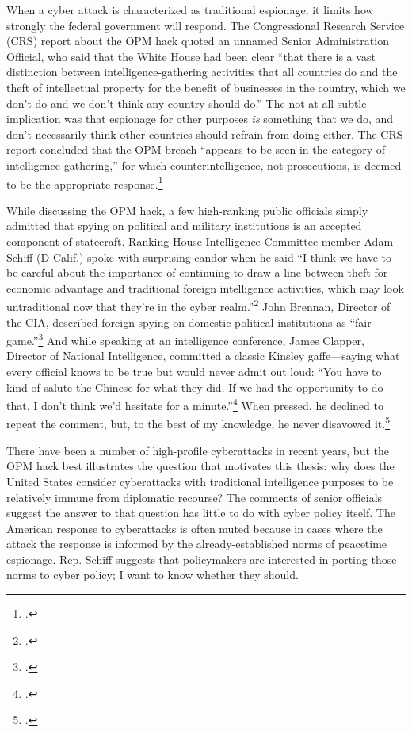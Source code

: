 \documentclass{memoir}
\begin{document}
\begin{refsegment}
When a cyber attack is characterized as traditional espionage, it limits how strongly the federal government will respond. The Congressional Research Service (CRS) report about the OPM hack quoted an unnamed Senior Administration Official, who said that the White House had been clear ``that there is a vast distinction between intelligence-gathering activities that all countries do and the theft of intellectual property for the benefit of businesses in the country, which we don't do and we don't think any country should do.'' The not-at-all subtle implication was that espionage for other purposes \emph{is} something that we do, and don't necessarily think other countries should refrain from doing either. The CRS report concluded that the OPM breach ``appears to be seen in the category of intelligence-gathering,'' for which counterintelligence, not prosecutions, is deemed to be the appropriate response.\footcite{finklea_cyber_2015}

While discussing the OPM hack, a few high-ranking public officials simply admitted that spying on political and military institutions is an accepted component of statecraft. Ranking House Intelligence Committee member Adam Schiff (D-Calif.) spoke with surprising candor when he said ``I think we have to be careful about the importance of continuing to draw a line between theft for economic advantage and traditional foreign intelligence activities, which may look untraditional now that they’re in the cyber realm.''\footcite{nakashima_hacks_2015} John Brennan, Director of the CIA, described foreign spying on domestic political institutions as ``fair game.''\footcite{sanger_u.s._2016} And while speaking at an intelligence conference, James Clapper, Director of National Intelligence, committed a classic Kinsley gaffe---saying what every official knows to be true but would never admit out loud: ``You have to kind of salute the Chinese for what they did. If we had the opportunity to do that, I don't think we'd hesitate for a minute.''\footcite{pepitone_clapper_2015} When pressed, he declined to repeat the comment, but, to the best of my knowledge, he never disavowed it.\footcite{sanger_u.s._2015}

There have been a number of high-profile cyberattacks in recent years, but the OPM hack best illustrates the question that motivates this thesis: why does the United States consider cyberattacks with traditional intelligence purposes to be relatively immune from diplomatic recourse? The comments of senior officials suggest the answer to that question has little to do with cyber policy itself. The American response to cyberattacks is often muted because in cases where the attack the response is informed by the already-established norms of peacetime espionage. Rep. Schiff suggests that policymakers are interested in porting those norms to cyber policy; I want to know whether they should.


\end{refsegment}
\end{document}
